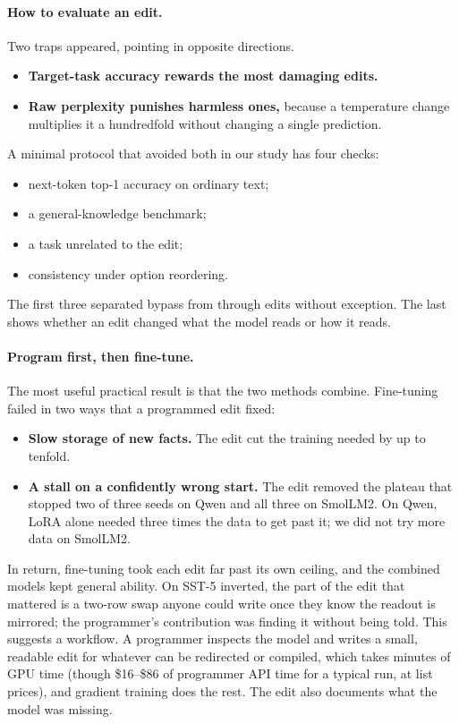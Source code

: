 \paragraph{How to evaluate an edit.} Two traps appeared, pointing in opposite directions.
\begin{itemize}
  \item \textbf{Target-task accuracy rewards the most damaging edits.}
  \item \textbf{Raw perplexity punishes harmless ones,} because a temperature change multiplies it a hundredfold without changing a single prediction.
\end{itemize}
A minimal protocol that avoided both in our study has four checks:
\begin{itemize}
  \item next-token top-1 accuracy on ordinary text;
  \item a general-knowledge benchmark;
  \item a task unrelated to the edit;
  \item consistency under option reordering.
\end{itemize}
The first three separated bypass from through edits without exception. The last shows whether an edit changed what the model reads or how it reads.

\paragraph{Program first, then fine-tune.} The most useful practical result is that the two methods combine. Fine-tuning failed in two ways that a programmed edit fixed:
\begin{itemize}
  \item \textbf{Slow storage of new facts.} The edit cut the training needed by up to tenfold.
  \item \textbf{A stall on a confidently wrong start.} The edit removed the plateau that stopped two of three seeds on Qwen and all three on SmolLM2. On Qwen, LoRA alone needed three times the data to get past it; we did not try more data on SmolLM2.
\end{itemize}
In return, fine-tuning took each edit far past its own ceiling, and the combined models kept general ability. On SST-5 inverted, the part of the edit that mattered is a two-row swap anyone could write once they know the readout is mirrored; the programmer's contribution was finding it without being told. This suggests a workflow. A programmer inspects the model and writes a small, readable edit for whatever can be redirected or compiled, which takes minutes of GPU time (though \$16--\$86 of programmer API time for a typical run, at list prices), and gradient training does the rest. The edit also documents what the model was missing.

